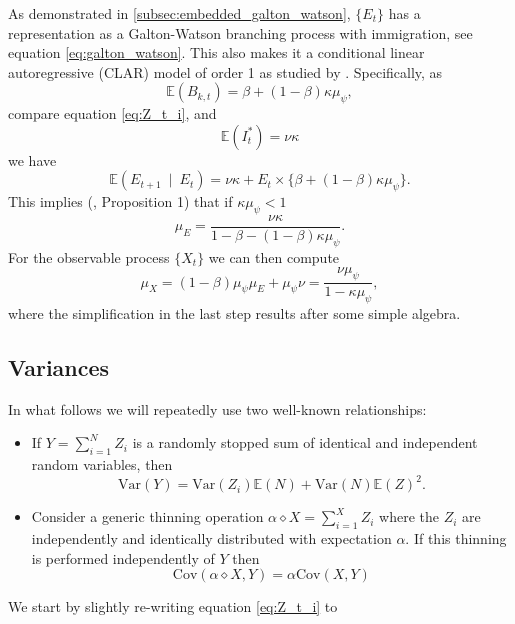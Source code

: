 \documentclass{article}
\begin{document}
As demonstrated in \ref{subsec:embedded_galton_watson}, $\{E_t\}$ has a representation as a Galton-Watson branching process with immigration, see equation \ref{eq:galton_watson}. This also makes it a conditional linear autoregressive (CLAR) model of order 1 as studied by \cite{Grunwald2000}. Specifically, as
$$
\mathbb{E}(B_{k, t}) = \beta + (1 - \beta)\kappa\mu_\psi,
$$
compare equation \eqref{eq:Z_t_i}, and
$$
\mathbb{E}(I^*_t) = \nu\kappa
$$
we have
$$
\mathbb{E}(E_{t + 1} \ \mid \ E_t) = \nu\kappa + E_t \times \{\beta + (1 - \beta)\kappa\mu_\psi\}.
$$
This implies (\cite{Grunwald2000}, Proposition 1) that if $\kappa \mu_\psi < 1$
$$
\mu_E = \frac{\nu\kappa}{1 - \beta - (1 - \beta)\kappa\mu_\psi}.
$$
For the observable process $\{X_t\}$ we can then compute
\begin{equation}
\mu_X = (1 - \beta)\mu_\psi\mu_E + \mu_\psi \nu = \frac{\nu\mu_\psi}{1 - \kappa\mu_\psi},\label{eq:CLAR}
\end{equation}
where the simplification in the last step results after some simple algebra.

\subsection{Variances}

In what follows we will repeatedly use two well-known relationships:
\begin{itemize}
\item If $Y = \sum_{i = 1}^N Z_i$ is a randomly stopped sum of identical and independent random variables, then
\begin{equation}
\text{Var}(Y) = \text{Var}(Z_i)\mathbb{E}(N) +  \text{Var}(N)\mathbb{E}(Z)^2.\label{eq:variance_rss}
\end{equation}
\item Consider a generic thinning operation $\alpha \diamond X = \sum_{i = 1}^X Z_i$ where the $Z_i$ are independently and identically distributed with expectation $\alpha$. If this thinning is performed independently of $Y$ then
\begin{equation}
\text{Cov}(\alpha \diamond X, Y) = \alpha \text{Cov}(X, Y)\label{eq:multiplication_independence}
\end{equation}
\end{itemize}


We start by slightly re-writing equation \eqref{eq:Z_t_i} to
\end{document}
